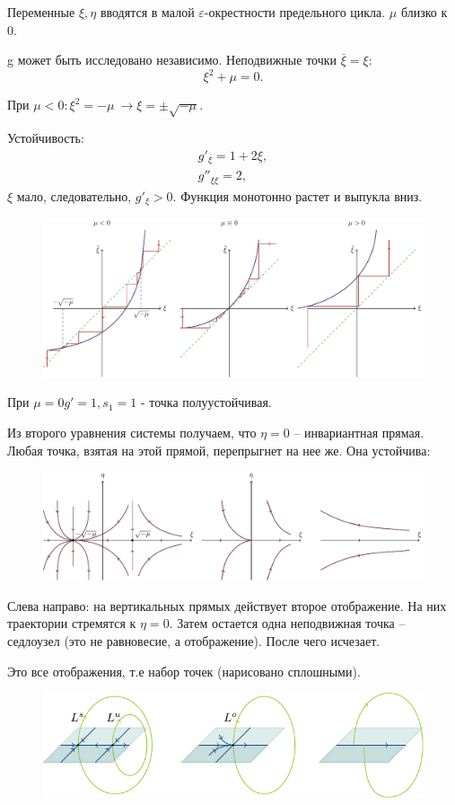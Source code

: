Переменные $\xi, \eta$ вводятся в малой $\varepsilon$-окрестности предельного цикла. $\mu$ близко к 0.

g может быть исследовано независимо. Неподвижные точки $\stackrel{\_}{\xi}=\xi$:
$$\xi^2+\mu=0.$$

При $\mu<0: \xi^2=-\mu~\rightarrow \xi=\pm \sqrt{-\mu}$.

Устойчивость:
\begin{gather*}
	g'_{\xi}=1+2\xi, \\
	g''_{\xi \xi}=2,
\end{gather*}
$\xi$ мало, следовательно, $g'_{\xi}>0$. Функция монотонно растет и выпукла вниз.
\begin{figure}[H]
	\centering
	\includegraphics[width=1\linewidth]{fig/fig64.pdf}   
\end{figure}

При $\mu=0 g'=1, s_1=1$ - точка полуустойчивая. 

Из второго уравнения системы получаем, что $\eta=0$ -- инвариантная прямая. Любая точка, взятая на этой прямой, перепрыгнет на нее же. Она устойчива:  
\begin{figure}[H]
	\centering
	\includegraphics[width=1\linewidth]{fig/fig65.pdf}   
\end{figure}

Слева направо: на вертикальных прямых действует второе отображение. На них траектории стремятся к $\eta=0$. Затем остается одна неподвижная точка -- седлоузел (это не равновесие, а отображение). После чего исчезает.

Это все отображения, т.е набор точек (нарисовано сплошными).
\begin{figure}[H]
	\centering
	\includegraphics[width=1\linewidth]{fig/fig66.pdf}   
\end{figure}

